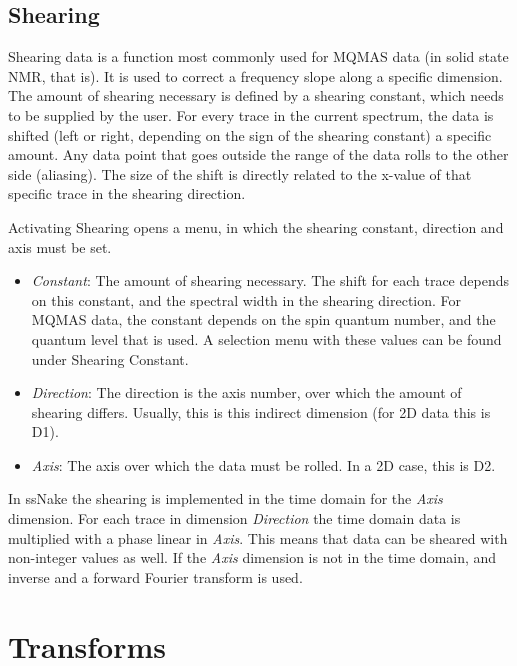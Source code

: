 \documentclass[11pt,a4paper]{article}
\begin{document}
\subsection{Shearing}
Shearing data is a function most commonly used for MQMAS data (in solid state NMR, that is).
It is used to correct a frequency slope along a specific dimension.
The amount of shearing necessary is defined by a shearing constant, which needs to be supplied by the user.
For every trace in the current spectrum, the data is shifted (left or right, depending on the sign of the shearing constant) a specific amount.
Any data point that goes outside the range of the data rolls to the other side (aliasing).
The size of the shift is directly related to the x-value of that specific trace in the shearing direction.

Activating Shearing opens a menu, in which the shearing constant, direction and axis must be set.

\begin{itemize}
  \item \textit{Constant}: The amount of shearing necessary. The shift for each trace depends on this constant, and the spectral width in the shearing direction.
	 For MQMAS data, the constant depends on the spin quantum number, and the quantum level that is used. A selection menu with these values can be found under Shearing Constant.
  \item \textit{Direction}: The direction is the axis number, over which the amount of shearing differs. Usually, this is this indirect dimension (for 2D data this is D1).
  \item \textit{Axis}: The axis over which the data must be rolled. In a 2D case, this is D2.
\end{itemize}

In ssNake the shearing is implemented in the time domain for the \textit{Axis} dimension.
For each trace in dimension \textit{Direction} the time domain data is multiplied with a phase linear in \textit{Axis}.
This means that data can be sheared with non-integer values as well.
If the \textit{Axis} dimension is not in the time domain, and inverse and a forward Fourier transform is used.

\section{Transforms}
\end{document}
